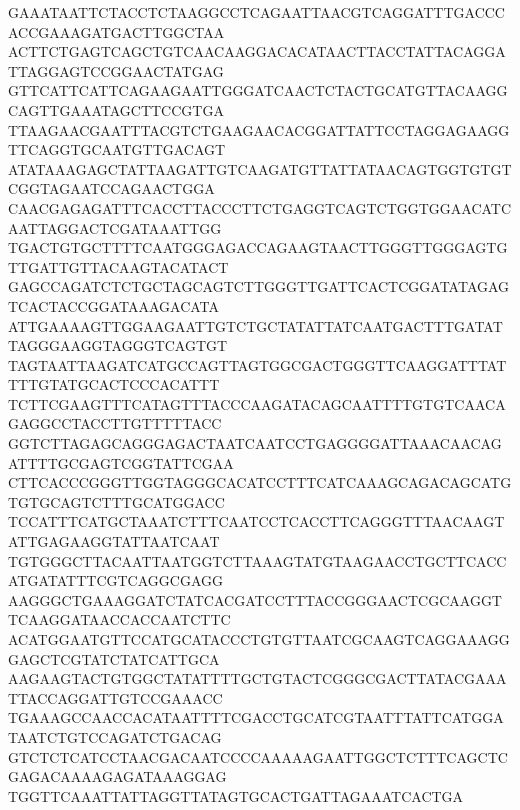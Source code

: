 GAAATAATTCTACCTCTAAGGCCTCAGAATTAACGTCAGGATTTGACCCACCGAAAGATGACTTGGCTAA
ACTTCTGAGTCAGCTGTCAACAAGGACACATAACTTACCTATTACAGGATTAGGAGTCCGGAACTATGAG
GTTCATTCATTCAGAAGAATTGGGATCAACTCTACTGCATGTTACAAGGCAGTTGAAATAGCTTCCGTGA
TTAAGAACGAATTTACGTCTGAAGAACACGGATTATTCCTAGGAGAAGGTTCAGGTGCAATGTTGACAGT
ATATAAAGAGCTATTAAGATTGTCAAGATGTTATTATAACAGTGGTGTGTCGGTAGAATCCAGAACTGGA
CAACGAGAGATTTCACCTTACCCTTCTGAGGTCAGTCTGGTGGAACATCAATTAGGACTCGATAAATTGG
TGACTGTGCTTTTCAATGGGAGACCAGAAGTAACTTGGGTTGGGAGTGTTGATTGTTACAAGTACATACT
GAGCCAGATCTCTGCTAGCAGTCTTGGGTTGATTCACTCGGATATAGAGTCACTACCGGATAAAGACATA
ATTGAAAAGTTGGAAGAATTGTCTGCTATATTATCAATGACTTTGATATTAGGGAAGGTAGGGTCAGTGT
TAGTAATTAAGATCATGCCAGTTAGTGGCGACTGGGTTCAAGGATTTATTTTGTATGCACTCCCACATTT
TCTTCGAAGTTTCATAGTTTACCCAAGATACAGCAATTTTGTGTCAACAGAGGCCTACCTTGTTTTTACC
GGTCTTAGAGCAGGGAGACTAATCAATCCTGAGGGGATTAAACAACAGATTTTGCGAGTCGGTATTCGAA
CTTCACCCGGGTTGGTAGGGCACATCCTTTCATCAAAGCAGACAGCATGTGTGCAGTCTTTGCATGGACC
TCCATTTCATGCTAAATCTTTCAATCCTCACCTTCAGGGTTTAACAAGTATTGAGAAGGTATTAATCAAT
TGTGGGCTTACAATTAATGGTCTTAAAGTATGTAAGAACCTGCTTCACCATGATATTTCGTCAGGCGAGG
AAGGGCTGAAAGGATCTATCACGATCCTTTACCGGGAACTCGCAAGGTTCAAGGATAACCACCAATCTTC
ACATGGAATGTTCCATGCATACCCTGTGTTAATCGCAAGTCAGGAAAGGGAGCTCGTATCTATCATTGCA
AAGAAGTACTGTGGCTATATTTTGCTGTACTCGGGCGACTTATACGAAATTACCAGGATTGTCCGAAACC
TGAAAGCCAACCACATAATTTTCGACCTGCATCGTAATTTATTCATGGATAATCTGTCCAGATCTGACAG
GTCTCTCATCCTAACGACAATCCCCAAAAAGAATTGGCTCTTTCAGCTCGAGACAAAAGAGATAAAGGAG
TGGTTCAAATTATTAGGTTATAGTGCACTGATTAGAAATCACTGA

